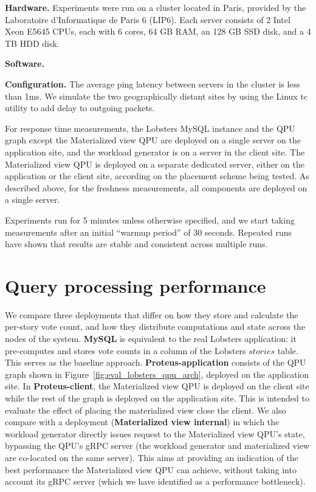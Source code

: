 \bigskip
\noindent
\textbf{Hardware.}
Experiments were run on a cluster located in Paris, provided by the Laboratoire d'Informatique de Paris 6 (LIP6).
Each server consists of 2 Intel Xeon E5645 CPUs, each with 6 cores, 64 GB RAM, an 128 GB SSD disk, and a 4 TB HDD disk.

\bigskip
\noindent
\textbf{Software.}

\bigskip
\noindent
\textbf{Configuration.}
The average ping latency between servers in the cluster is less than 1ms.
We simulate the two geographically distant sites by using the Linux tc utility \cite{tc} to add delay to outgoing packets.

For response time measurements, the Lobsters MySQL instance and the QPU graph except the Materialized view QPU are deployed
on a single server on the application site, and the workload generator is on a server in the client site.
The Materialized view QPU is deployed on a separate dedicated server, either on the application or the client site,
according on the placement scheme being tested.
As described above, for the freshness measurements, all components are deployed on a single server.

Experiments run for 5 minutes unless otherwise specified, and we start taking measurements after an initial
``warmup period'' of 30 seconds.
Repeated runs have shown that results are stable and consistent across multiple runs.


\section{Query processing performance}
\label{sec:eval_query_processing_perf}
We compare three deployments that differ on how they store and calculate the per-story vote count,
and how they distribute computations and state across the nodes of the system.
\textbf{MySQL} is equivalent to the real Lobsters application:
it pre-computes and stores vote counts in a column of the Lobsters $stories$ table.
This serves as the baseline approach.
\textbf{Proteus-application} consists of the QPU graph shown in Figure~\ref{fig:eval_lobsters_qpu_arch},
deployed on the application site.
In \textbf{Proteus-client}, the Materialized view QPU is deployed on the client site while the rest of the graph
is deployed on the application site.
This is intended to evaluate the effect of placing the materialized view close the client.
We also compare with a deployment (\textbf{Materialized view internal}) in which the workload generator
directly issues request to the Materialized view QPU's state, bypassing the QPU's gRPC server
(the workload generator and materialized view are co-located on the same server).
This aims at providing an indication of the best performance the Materialized view QPU can achieve,
without taking into account its gRPC server (which we have identified as a performance bottleneck).

